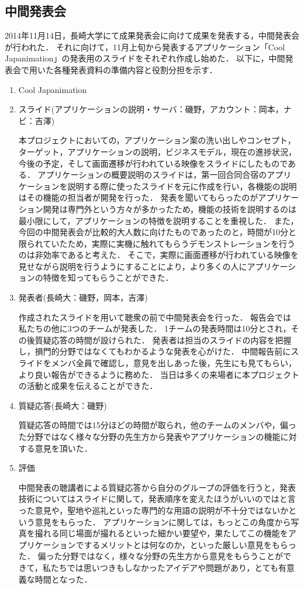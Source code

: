 \subsection{中間発表会} 
\par
2014年11月14日，長崎大学にて成果発表会に向けて成果を発表する，中間発表会が行われた．
それに向けて，11月上旬から発表するアプリケーション「Cool Japanimation」の発表用のスライドをそれぞれ作成し始めた．
以下に，中間発表会で用いた各種発表資料の準備内容と役割分担を示す．
\begin{enumerate}
\item Cool Japanimation　
\par
\item スライド(アプリケーションの説明・サーバ：磯野，アカウント：岡本，ナビ：吉澤) 
\par
本プロジェクトにおいての，アプリケーション案の洗い出しやコンセプト，ターゲット，アプリケーションの説明，ビジネスモデル，現在の進捗状況，今後の予定，そして画面遷移が行われている映像をスライドにしたものである．
アプリケーションの概要説明のスライドは，第一回合同合宿のアプリケーションを説明する際に使ったスライドを元に作成を行い，各機能の説明はその機能の担当者が開発を行った．
発表を聞いてもらったのがアプリケーション開発は専門外という方々が多かったため，機能の技術を説明するのは最小限にして，アプリケーションの特徴を説明することを重視した．
また，今回の中間発表会が比較的大人数に向けたものであったのと，時間が10分と限られていたため，実際に実機に触れてもらうデモンストレーションを行うのは非効率であると考えた．
そこで，実際に画面遷移が行われている映像を見せながら説明を行うようにすることにより，より多くの人にアプリケーションの特徴を知ってもらうことができた．
\item 発表者(長崎大：磯野，岡本，吉澤)
\par
作成されたスライドを用いて聴衆の前で中間発表会を行った．
報告会では私たちの他に3つのチームが発表した．
1チームの発表時間は10分とされ，その後質疑応答の時間が設けられた．
発表者は担当のスライドの内容を把握し，損門的分野ではなくてもわかるような発表を心がけた．
中間報告前にスライドをメンバ全員で確認し，意見を出しあった後，先生にも見てもらい，より良い報告ができるように務めた．
当日は多くの来場者に本プロジェクトの活動と成果を伝えることができた． 
\item 質疑応答(長崎大：磯野) 
\par
質疑応答の時間では15分ほどの時間が取られ，他のチームのメンバや，偏った分野ではなく様々な分野の先生方から発表やアプリケーションの機能に対する意見を頂いた． 
\item 評価 
\par
中間発表の聴講者による質疑応答から自分のグループの評価を行うと，発表技術についてはスライドに関して，発表順序を変えたほうがいいのではと言った意見や，聖地や巡礼といった専門的な用語の説明が不十分ではないかという意見をもらった．
アプリケーションに関しては，もっとこの角度から写真を撮れる同じ場面が撮れるといった細かい要望や，果たしてこの機能をアプリケーションでするメリットとは何なのか，といった厳しい意見をもらった．
偏った分野ではなく，様々な分野の先生方から意見をもらうことができて，私たちでは思いつきもしなかったアイデアや問題があり，とても有意義な時間となった．
\end{enumerate}　
\par
{}
